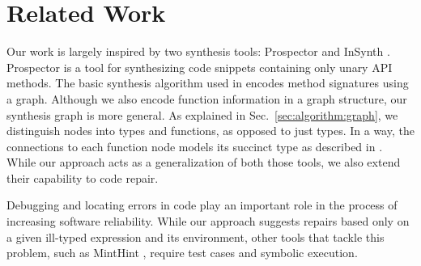 \section{Related Work}
\label{sec:related}

Our work is largely inspired by two synthesis tools: Prospector \cite{MandelinetALL2005Jungloid} and InSynth \cite{GveroETAL13CompleteCompletionTypesWeights, DBLP:conf/cav/GveroKP11}. Prospector is a tool for synthesizing code snippets containing only unary API methods. The basic synthesis algorithm used in \cite{MandelinetALL2005Jungloid} encodes method signatures using a graph. Although we also encode function information in a graph structure, our synthesis graph is more general. As explained in Sec.~\ref{sec:algorithm:graph}, we distinguish nodes into types and functions, as opposed to just types. In a way, the connections to each function node models its succinct type as described in \cite{GveroETAL13CompleteCompletionTypesWeights}. While our approach acts as a generalization of both those tools, we also extend their capability to code repair.

Debugging and locating errors in code \cite{Pavlinovic:2014, Chandra:2011:AD} play an important role in the process of increasing software reliability. While our approach suggests repairs based only on a given ill-typed expression and its environment, other tools that tackle this problem, such as MintHint \cite{MintHint}, require test cases and symbolic execution.

